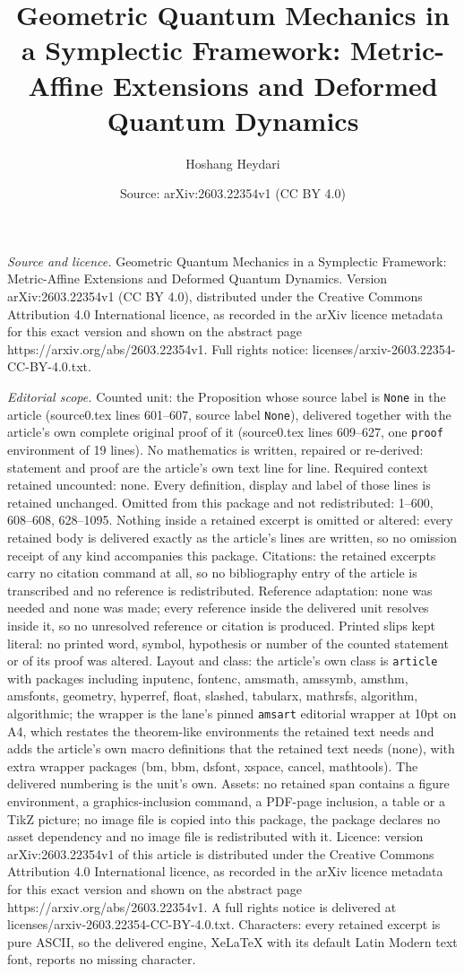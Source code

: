\documentclass[10pt,a4paper]{amsart}
\title[Geometric Quantum Mechanics in a Symplectic Framework: Metri]{Geometric Quantum Mechanics in a Symplectic Framework: Metric-Affine Extensions and Deformed Quantum Dynamics}
\author{Hoshang Heydari}
\date{Source: arXiv:2603.22354v1 (CC BY 4.0)}
\begin{document}
\maketitle

\noindent\emph{Source and licence.} Geometric Quantum Mechanics in a Symplectic Framework: Metric-Affine Extensions and Deformed Quantum Dynamics. Version arXiv:2603.22354v1 (CC BY 4.0), distributed under the Creative Commons Attribution 4.0 International licence, as recorded in the arXiv licence metadata for this exact version and shown on the abstract page https://arxiv.org/abs/2603.22354v1. Full rights notice: licenses/arxiv-2603.22354-CC-BY-4.0.txt.\par\smallskip

\noindent\textit{Editorial scope.} Counted unit: the Proposition whose source label is \texttt{None} in the article (source0.tex lines 601--607, source label \texttt{None}), delivered together with the article's own complete original proof of it (source0.tex lines 609--627, one \texttt{proof} environment of 19 lines). No mathematics is written, repaired or re-derived: statement and proof are the article's own text line for line. Required context retained uncounted: none. Every definition, display and label of those lines is retained unchanged. Omitted from this package and not redistributed: 1--600, 608--608, 628--1095. Nothing inside a retained excerpt is omitted or altered: every retained body is delivered exactly as the article's lines are written, so no omission receipt of any kind accompanies this package. Citations: the retained excerpts carry no citation command at all, so no bibliography entry of the article is transcribed and no reference is redistributed. Reference adaptation: none was needed and none was made; every reference inside the delivered unit resolves inside it, so no unresolved reference or citation is produced. Printed slips kept literal: no printed word, symbol, hypothesis or number of the counted statement or of its proof was altered. Layout and class: the article's own class is \texttt{article} with packages including inputenc, fontenc, amsmath, amssymb, amsthm, amsfonts, geometry, hyperref, float, slashed, tabularx, mathrsfs, algorithm, algorithmic; the wrapper is the lane's pinned \texttt{amsart} editorial wrapper at 10pt on A4, which restates the theorem-like environments the retained text needs and adds the article's own macro definitions that the retained text needs (none), with extra wrapper packages (bm, bbm, dsfont, xspace, cancel, mathtools). The delivered numbering is the unit's own. Assets: no retained span contains a figure environment, a graphics-inclusion command, a PDF-page inclusion, a table or a TikZ picture; no image file is copied into this package, the package declares no asset dependency and no image file is redistributed with it. Licence: version arXiv:2603.22354v1 of this article is distributed under the Creative Commons Attribution 4.0 International licence, as recorded in the arXiv licence metadata for this exact version and shown on the abstract page https://arxiv.org/abs/2603.22354v1. A full rights notice is delivered at licenses/arxiv-2603.22354-CC-BY-4.0.txt. Characters: every retained excerpt is pure ASCII, so the delivered engine, XeLaTeX with its default Latin Modern text font, reports no missing character.
\end{document}
